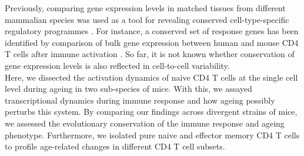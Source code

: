 Previously, comparing gene expression levels in matched tissues from different mammalian species was used as a tool for revealing conserved cell-type-specific regulatory programmes \citep{Sudmant2015, Finseth2014, Brawand2011, Flajnik2009}. 
For instance, a conserved set of response genes has been identified by comparison of bulk gene expression between human and mouse CD4\plus{} T cells after immune activation \citep{Shay2013}. 
So far, it is not known whether conservation of gene expression levels is also reflected in cell-to-cell variability.\\

Here, we dissected the activation dynamics of naive CD4\plus{} T cells at the single cell level during ageing in two sub-species of mice. 
With this, we assayed transcriptional dynamics during immune response and how ageing possibly perturbs this system. 
By comparing our findings across divergent strains of mice, we assessed the evolutionary conservation of the immune response and ageing phenotype. 
Furthermore, we isolated pure naive and effector memory CD4\plus{} T cells to profile age-related changes in different CD4\plus{} T cell subsets.
